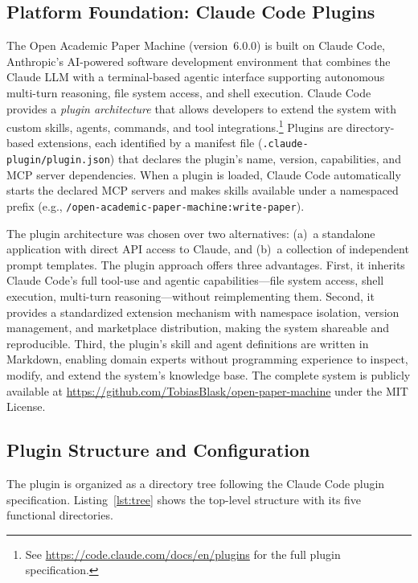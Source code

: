 \documentclass{article}
\begin{document}
\subsection{Platform Foundation: Claude Code Plugins}

The Open Academic Paper Machine (version~6.0.0) is built on Claude Code, Anthropic's AI-powered software development environment that combines the Claude LLM with a terminal-based agentic interface supporting autonomous multi-turn reasoning, file system access, and shell execution. Claude Code provides a \emph{plugin architecture} that allows developers to extend the system with custom skills, agents, commands, and tool integrations.\footnote{See \url{https://code.claude.com/docs/en/plugins} for the full plugin specification.} Plugins are directory-based extensions, each identified by a manifest file (\texttt{.claude-plugin/plugin.json}) that declares the plugin's name, version, capabilities, and MCP server dependencies. When a plugin is loaded, Claude Code automatically starts the declared MCP servers and makes skills available under a namespaced prefix (e.g., \texttt{/open-academic-paper-machine:write-paper}).

The plugin architecture was chosen over two alternatives: (a)~a standalone application with direct API access to Claude, and (b)~a collection of independent prompt templates. The plugin approach offers three advantages. First, it inherits Claude Code's full tool-use and agentic capabilities---file system access, shell execution, multi-turn reasoning---without reimplementing them. Second, it provides a standardized extension mechanism with namespace isolation, version management, and marketplace distribution, making the system shareable and reproducible. Third, the plugin's skill and agent definitions are written in Markdown, enabling domain experts without programming experience to inspect, modify, and extend the system's knowledge base. The complete system is publicly available at \url{https://github.com/TobiasBlask/open-paper-machine} under the MIT License.

\subsection{Plugin Structure and Configuration}

The plugin is organized as a directory tree following the Claude Code plugin specification. Listing~\ref{lst:tree} shows the top-level structure with its five functional directories.
\end{document}
